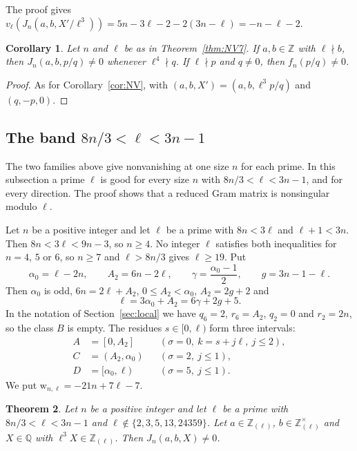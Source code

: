 \documentclass[11pt]{amsart}
\newtheorem{theorem}{Theorem}[section]
\newtheorem{corollary}[theorem]{Corollary}
\theoremstyle{definition}
\theoremstyle{remark}
\numberwithin{equation}{section}
\newcommand{\Z}{\mathbb Z}
\newcommand{\Q}{\mathbb Q}
\begin{document}
The proof gives $v_\ell(J_n(a,b,X'/\ell^3))=5n-3\ell-2-2(3n-\ell)=-n-\ell-2$.

\begin{corollary}\label{cor:NV7}
Let $n$ and $\ell$ be as in Theorem~\textup{\ref{thm:NV7}}. If $a,b\in\Z$ with $\ell\nmid b$, then $J_n(a,b,p/q)\ne0$
whenever $\ell^4\nmid q$. If $\ell\nmid p$ and $q\ne0$, then $f_n(p/q)\ne0$.
\end{corollary}

\begin{proof}
As for Corollary~\ref{cor:NV}, with $(a,b,X')=(a,b,\ell^3p/q)$ and $(q,-p,0)$.
\end{proof}

\subsection{The band \texorpdfstring{$8n/3<\ell<3n-1$}{8n/3 < l < 3n-1}}\label{ssec:band}
The two families above give nonvanishing at one size $n$ for each prime. In this subsection a prime $\ell$ is good for
every size $n$ with $8n/3<\ell<3n-1$, and for every direction. The proof shows that a reduced Gram matrix is
nonsingular modulo $\ell$.

Let $n$ be a positive integer and let $\ell$ be a prime with $8n<3\ell$ and $\ell+1<3n$. Then $8n<3\ell<9n-3$, so
$n\ge4$. No integer $\ell$ satisfies both inequalities for $n=4$, $5$ or $6$, so $n\ge7$ and $\ell>8n/3$ gives
$\ell\ge19$. Put
\[
 \alpha_0=\ell-2n,\qquad A_2=6n-2\ell,\qquad \gamma=\frac{\alpha_0-1}2,\qquad g=3n-1-\ell .
\]
Then $\alpha_0$ is odd, $6n=2\ell+A_2$, $0\le A_2<\alpha_0$, $A_2=2g+2$ and
\begin{equation}\label{eq:band}
 \ell=3\alpha_0+A_2=6\gamma+2g+5 .
\end{equation}
In the notation of Section~\ref{sec:local} we have $q_6=2$, $r_6=A_2$, $q_2=0$ and $r_2=2n$, so the class $B$ is empty. The
residues $s\in[0,\ell)$ form three intervals:
\[
 \begin{aligned}
 A&=[0,A_2]&&(\sigma=0,\ k=s+j\ell,\ j\le2),\\
 C&=(A_2,\alpha_0)&&(\sigma=2,\ j\le1),\\
 D&=[\alpha_0,\ell)&&(\sigma=5,\ j\le1).
 \end{aligned}
\]
We put $\mathrm{w}_{n,\ell}=-21n+7\ell-7$.

\begin{theorem}\label{thm:B83}
Let $n$ be a positive integer and let $\ell$ be a prime with $8n/3<\ell<3n-1$ and $\ell\notin\{2,3,5,13,24359\}$.
Let $a\in\Z_{(\ell)}$, $b\in\Z_{(\ell)}^\times$ and $X\in\Q$ with $\ell^3X\in\Z_{(\ell)}$. Then $J_n(a,b,X)\ne0$.
\end{theorem}
\end{document}
